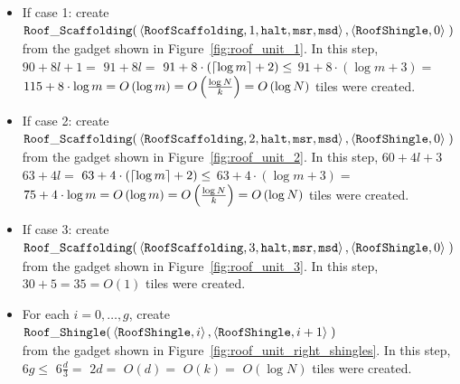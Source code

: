 \begin{itemize}
    \item If case 1: create
    $\begin{aligned}[t]
        \roofscaffolding(& \left\langle {\tt RoofScaffolding}, 1, {\tt halt}, {\tt msr}, {\tt msd} \right\rangle,
                           \left\langle {\tt RoofShingle},     0                                   \right\rangle \;)
    \end{aligned}$\\from the gadget shown in Figure~\ref{fig:roof_unit_1}.
    In this step, $90 + 8l + 1 =$
    $91 + 8l =$
    $91 + 8 \cdot \left( \ceil*{\log m} + 2 \right) \leq$
    $91 + 8 \cdot \left( {\log m} + 3 \right) =$
    $115 + 8 \cdot {\log m} = \bigologm$ tiles were created.
    \vspace{0.5cm}

    \item If case 2: create
    $\begin{aligned}[t]
        \roofscaffolding(& \left\langle {\tt RoofScaffolding}, 2, {\tt halt}, {\tt msr}, {\tt msd} \right\rangle,
                           \left\langle {\tt RoofShingle},     0                                   \right\rangle \;)
    \end{aligned}$\\from the gadget shown in Figure~\ref{fig:roof_unit_2}.
    In this step, $60 + 4l + 3$
    $63 + 4l =$
    $63 + 4 \cdot \left( \ceil*{\log m} + 2 \right) \leq$
    $63 + 4 \cdot \left( {\log m} + 3 \right) =$
    $75 + 4 \cdot {\log m} = \bigologm$ tiles were created.
    \vspace{0.5cm}

    \item If case 3: create
    $\begin{aligned}[t]
        \roofscaffolding(& \left\langle {\tt RoofScaffolding}, 3, {\tt halt}, {\tt msr}, {\tt msd} \right\rangle,
                           \left\langle {\tt RoofShingle},     0                                   \right\rangle \;)
    \end{aligned}$\\from the gadget shown in Figure~\ref{fig:roof_unit_3}.
    In this step, $30 + 5 = 35 = O\left( 1 \right)$ tiles were created.
    \vspace{0.5cm}


    \item For each $i = 0,\ldots,g$, create
    $\begin{aligned}[t]
        \roofshingle(& \left\langle {\tt RoofShingle}, i     \right\rangle,
                       \left\langle {\tt RoofShingle}, i + 1 \right\rangle \;)
    \end{aligned}$\\from the gadget shown in Figure~\ref{fig:roof_unit_right_shingles}.
    In this step, $6g \leq$
    $6 \frac{d}{3} =$
    $2d =$
    $O\left( d \right) =$
    $O\left( k \right) =$
    $O\left( {\log N} \right)$ tiles were created.
    \vspace{0.5cm}


\end{itemize}

